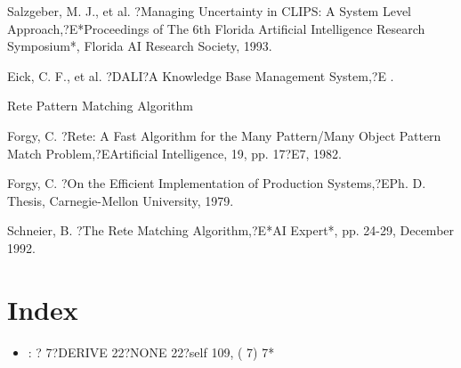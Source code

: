 \documentclass[letterpaper,10pt,english]{sphinxmanual}
\begin{document}
Salzgeber, M. J., et al. ?Managing Uncertainty in CLIPS: A System Level
Approach,?E*Proceedings of The 6th Florida Artificial Intelligence
Research Symposium*, Florida AI Research Society, 1993.

Eick, C. F., et al. ?DALI?A Knowledge Base Management System,?E
.

Rete Pattern Matching Algorithm

Forgy, C. ?Rete: A Fast Algorithm for the Many Pattern/Many Object
Pattern Match Problem,?EArtificial Intelligence, 19, pp. 17?E7, 1982.

Forgy, C. ?On the Efficient Implementation of Production Systems,?EPh.
D. Thesis, Carnegie-Mellon University, 1979.

Schneier, B. ?The Rete Matching Algorithm,?E*AI Expert*, pp. 24-29,
December 1992.


\chapter{Index}
\label{\detokenize{appendix:index}}\begin{itemize}
\item {} 
: ? 7?DERIVE 22?NONE 22?self 109, ( 7) 7*

\end{itemize}
\end{document}
